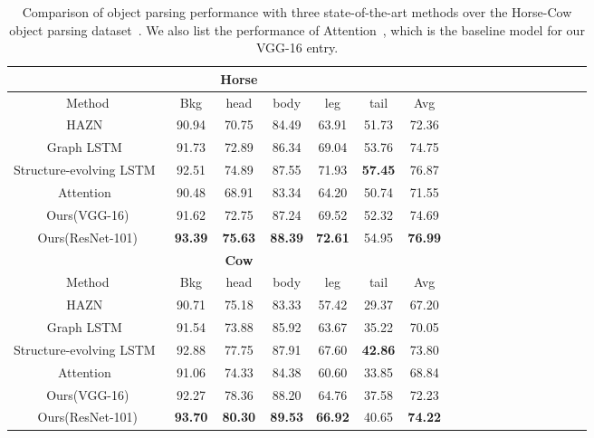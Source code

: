 \documentclass[10pt,twocolumn,letterpaper]{article}
\begin{document}
\begin{table}[!tp]\setlength{\tabcolsep}{3.3pt}
	\centering\scriptsize
	\begin{tabular}{cccccccccccccccccc}
		\toprule
		& & \textbf{Horse} & & &\\
		\hline
		{Method} &  Bkg   &  head  &  body  & leg & tail & Avg \\
		\midrule
		HAZN~\cite{xia2016zoom} & 90.94 & 70.75 & 84.49 & 63.91 & 51.73 & 72.36\\
		{Graph LSTM}~\cite{liang2016semantic} & {91.73} & {72.89} & {86.34} & {69.04} & {53.76} & {74.75}\\
		Structure-evolving LSTM~\cite{liang2017interpretable} & 92.51 & 74.89 & 87.55 & 71.93 & \textbf{57.45} & 76.87\\
		\midrule
        Attention~\cite{chen2016attention} & {90.48} & {68.91} & {83.34} & {64.20} & {50.74} & {71.55}\\
        Ours(VGG-16) & {91.62} & {72.75} & {87.24} & {69.52} & {52.32} & {74.69}\\
        Ours(ResNet-101) & \textbf{93.39} & \textbf{75.63} & \textbf{88.39} & \textbf{72.61} & 54.95 &\textbf{76.99}\\
        \midrule
		& & \textbf{Cow}&  & &\\
		\hline
		{Method} &  Bkg   &  head  &  body  & leg & tail & Avg \\
		\midrule
		HAZN~\cite{xia2016zoom} & 90.71 & 75.18 & 83.33 & 57.42 & 29.37 & {67.20} \\
		{Graph LSTM}~\cite{liang2016semantic} & {91.54} & {73.88} & {85.92} & 63.67 & {35.22} & {70.05}\\
		Structure-evolving LSTM~\cite{liang2017interpretable} & {92.88} & {77.75} & {87.91} & {67.60} & \textbf{42.86} & {73.80}\\
		\midrule
        Attention~\cite{chen2016attention} & {91.06} & {74.33} & {84.38} & {60.60} & {33.85} & {68.84}\\
        Ours(VGG-16) & {92.27} & {78.36} & {88.20} & {64.76} & {37.58} & {72.23}\\
        Ours(ResNet-101) & \textbf{93.70} & \textbf{80.30} & \textbf{89.53} & \textbf{66.92} & 40.65 &\textbf{74.22}\\
		\bottomrule
	\end{tabular}\caption{Comparison of object parsing performance with three state-of-the-art methods over the Horse-Cow object parsing dataset~\cite{wang2015semantic}. We also list the performance of Attention~\cite{chen2016attention}, which is the baseline model for our VGG-16 entry.}
\label{tab:horsecow}
\vspace{-4mm}
\end{table}\vspace{-1mm}
\end{document}
